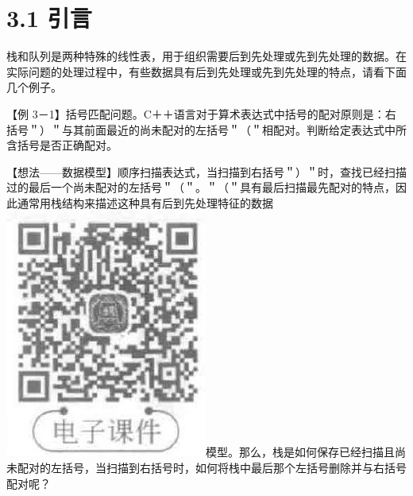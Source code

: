\documentclass[10pt]{article}
\begin{document}
\section*{3.1 引言}
栈和队列是两种特殊的线性表，用于组织需要后到先处理或先到先处理的数据。在实际问题的处理过程中，有些数据具有后到先处理或先到先处理的特点，请看下面几个例子。

【例 3－1】括号匹配问题。C＋＋语言对于算术表达式中括号的配对原则是：右括号＂）＂与其前面最近的尚未配对的左括号＂（＂相配对。判断给定表达式中所含括号是否正确配对。

【想法——数据模型】顺序扫描表达式，当扫描到右括号＂）＂时，查找已经扫描过的最后一个尚未配对的左括号＂（＂。＂（＂具有最后扫描最先配对的特点，因此通常用栈结构来描述这种具有后到先处理特征的数据\\
\includegraphics[max width=\textwidth]{2025_06_06_704745ea57b15b2333e5g-083}模型。那么，栈是如何保存已经扫描且尚未配对的左括号，当扫描到右括号时，如何将栈中最后那个左括号删除并与右括号配对呢？
\end{document}
